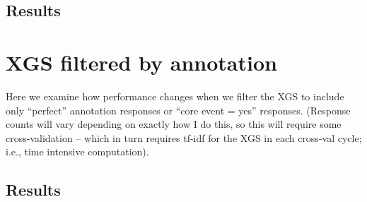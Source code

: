\subsection{Results}
\label{subsection:first-responses-results}

\section{XGS filtered by annotation}
\label{section:experiment-filtered}
Here we examine how performance changes when we filter the XGS to include only ``perfect'' annotation responses or ``core event = yes'' responses. (Response counts will vary depending on exactly how I do this, so this will require some cross-validation -- which in turn requires tf-idf for the XGS in each cross-val cycle; i.e., time intensive computation).
\subsection{Results}
\label{subsection:filtered-results}
